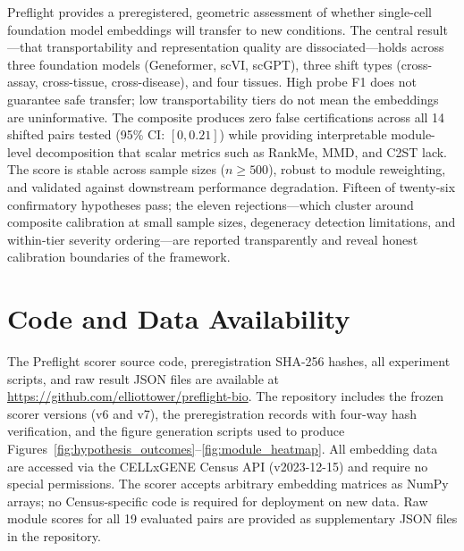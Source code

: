 \documentclass[11pt,letterpaper]{article}
\begin{document}
Preflight provides a preregistered, geometric assessment of whether single-cell foundation model embeddings will transfer to new conditions. The central result---that transportability and representation quality are dissociated---holds across three foundation models (Geneformer, scVI, scGPT), three shift types (cross-assay, cross-tissue, cross-disease), and four tissues. High probe F1 does not guarantee safe transfer; low transportability tiers do not mean the embeddings are uninformative. The composite produces zero false certifications across all 14 shifted pairs tested (95\% CI: $[0, 0.21]$) while providing interpretable module-level decomposition that scalar metrics such as RankMe, MMD, and C2ST lack. The score is stable across sample sizes ($n \geq 500$), robust to module reweighting, and validated against downstream performance degradation. Fifteen of twenty-six confirmatory hypotheses pass; the eleven rejections---which cluster around composite calibration at small sample sizes, degeneracy detection limitations, and within-tier severity ordering---are reported transparently and reveal honest calibration boundaries of the framework.


\section*{Code and Data Availability}

The Preflight scorer source code, preregistration SHA-256 hashes, all experiment scripts, and raw result JSON files are available at \url{https://github.com/elliottower/preflight-bio}. The repository includes the frozen scorer versions (v6 and v7), the preregistration records with four-way hash verification, and the figure generation scripts used to produce Figures~\ref{fig:hypothesis_outcomes}--\ref{fig:module_heatmap}. All embedding data are accessed via the CELLxGENE Census API (v2023-12-15) and require no special permissions. The scorer accepts arbitrary embedding matrices as NumPy arrays; no Census-specific code is required for deployment on new data. Raw module scores for all 19 evaluated pairs are provided as supplementary JSON files in the repository.



\end{document}
